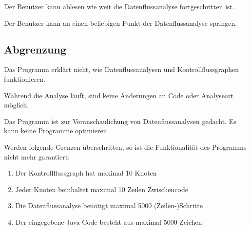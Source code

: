 Der Benutzer kann ablesen wie weit die Datenflussanalyse fortgeschritten ist.

Der Benutzer kann an einen beliebigen Punkt der Datenflussanalyse springen.

\subsection{Abgrenzung}

Das Programm erklärt nicht, wie Datenflussanalysen und Kontrollflussgraphen funktionieren.

Während die Analyse läuft, sind keine Änderungen an Code oder Analyseart möglich.

Das Programm ist zur Veranschaulichung von Datenflussanalysen gedacht. Es kann keine Programme optimieren.

Werden folgende Grenzen überschritten, so ist die Funktionalität des Programms nicht mehr garantiert:
\begin{enumerate}[label=(\alph*)]
\item Der Kontrollflussgraph hat maximal 10 Knoten
\item Jeder Knoten beinhaltet maximal 10 Zeilen Zwischencode
\item Die Datenflussanalyse benötigt maximal 5000 (Zeilen-)Schritte
\item Der eingegebene Java-Code besteht aus maximal 5000 Zeichen
\end{enumerate}